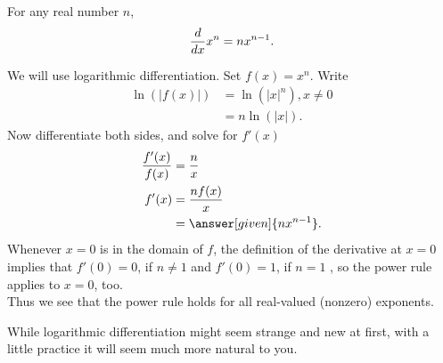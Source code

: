 \documentclass{ximera}
\begin{document}
\begin{theorem}
For any  real number $n$, 
\[
\frac{d}{\mathop{}\!d x} x^n = n x^{n-1}.
\]
\begin{explanation}

We will use logarithmic differentiation. Set $f(x) = x^n$. Write
\begin{align*}
\ln(|f(x)|) &= \ln\left(|x|^n\right) , x\ne0\\ 
&= n\ln(|x|).
\end{align*}
Now differentiate both sides, and solve for $f'(x)$
\begin{align*}
\frac{f'(x)}{f(x)} &= \frac{n}{x}\\
f'(x) &=\frac{n f(x)}{x}\\
&= \answer[given]{n x^{n-1}}.
\end{align*}
Whenever $x=0$ is in the domain of $f$, the definition of the derivative at $x=0$ implies that  $f'(0)=0$, if $n\ne1$ and $f'(0)=1$, if $n=1$ , so the power rule applies to $x=0$, too.\\

Thus we see that the power rule holds for all real-valued (nonzero) exponents.
\end{explanation}
\end{theorem}

While logarithmic differentiation might seem strange and new at
first, with a little practice it will seem much more natural to you.
\end{document}
